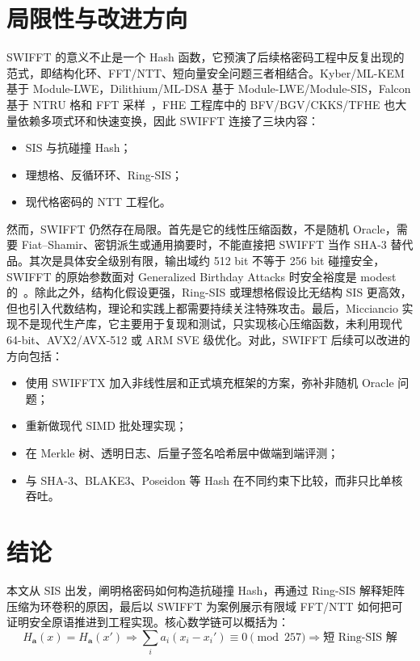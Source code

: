 \documentclass{article}
\begin{document}
\section{局限性与改进方向}
SWIFFT 的意义不止是一个 Hash 函数，它预演了后续格密码工程中反复出现的范式，即结构化环、FFT/NTT、短向量安全问题三者相结合。Kyber/ML-KEM 基于 Module-LWE，Dilithium/ML-DSA 基于 Module-LWE/Module-SIS，Falcon 基于 NTRU 格和 FFT 采样~\cite{Kyber,Dilithium,Falcon}，FHE 工程库中的 BFV/BGV/CKKS/TFHE 也大量依赖多项式环和快速变换，因此 SWIFFT 连接了三块内容：

\begin{itemize}
    \item[$\divideontimes$] SIS 与抗碰撞 Hash；
    \item[$\divideontimes$] 理想格、反循环环、Ring-SIS；
    \item[$\divideontimes$] 现代格密码的 NTT 工程化。
\end{itemize}

然而，SWIFFT 仍然存在局限。首先是它的线性压缩函数，不是随机 Oracle，需要 Fiat--Shamir、密钥派生或通用摘要时，不能直接把 SWIFFT 当作 SHA-3 替代品。其次是具体安全级别有限，输出域约 512 bit 不等于 256 bit 碰撞安全，SWIFFT 的原始参数面对 Generalized Birthday Attacks 时安全裕度是 modest 的~\cite{Wagner02,SWIFFT08}。除此之外，结构化假设更强，Ring-SIS 或理想格假设比无结构 SIS 更高效，但也引入代数结构，理论和实践上都需要持续关注特殊攻击。最后，Micciancio 实现不是现代生产库，它主要用于复现和测试，只实现核心压缩函数，未利用现代 64-bit、AVX2/AVX-512 或 ARM SVE 级优化。对此，SWIFFT 后续可以改进的方向包括：

\begin{itemize}
    \item[$\divideontimes$] 使用 SWIFFTX 加入非线性层和正式填充框架的方案，弥补非随机 Oracle 问题；
    \item[$\divideontimes$] 重新做现代 SIMD 批处理实现；
    \item[$\divideontimes$] 在 Merkle 树、透明日志、后量子签名哈希层中做端到端评测；
    \item[$\divideontimes$] 与 SHA-3、BLAKE3、Poseidon 等 Hash 在不同约束下比较，而非只比单核吞吐。
\end{itemize}



\section{结论}
本文从 SIS 出发，阐明格密码如何构造抗碰撞 Hash，再通过 Ring-SIS 解释矩阵压缩为环卷积的原因，最后以 SWIFFT 为案例展示有限域 FFT/NTT 如何把可证明安全原语推进到工程实现。核心数学链可以概括为：
\[ H_{\bm a}(x)=H_{\bm a}(x')\Longrightarrow\sum_i a_i(x_i-x_i')\equiv0\pmod{257}\Longrightarrow\text{短 Ring-SIS 解} \]
\end{document}
